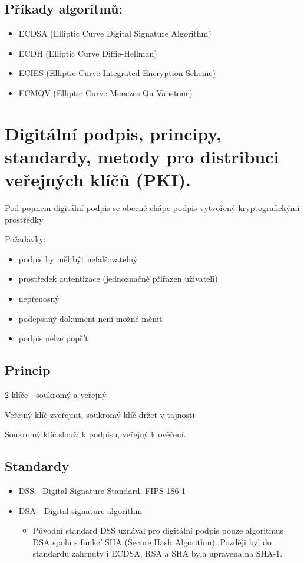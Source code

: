 \subsection{Příkady algoritmů:}
\begin{itemize}
    \item ECDSA (Elliptic Curve Digital Signature Algorithm)
    \item ECDH (Elliptic Curve Diffie-Hellman)
    \item ECIES (Elliptic Curve Integrated Encryption Scheme)
    \item ECMQV (Elliptic Curve Menezes-Qu-Vanstone)
\end{itemize}

\clearpage
\section{Digitální podpis, principy, standardy, metody pro distribuci veřejných klíčů (PKI).}
 
Pod pojmem digitální podpis se obecně chápe podpis vytvořený kryptografickými prostředky

Požadavky:
\begin{itemize}
    \item podpis by měl být nefalšovatelný
    \item prostředek autentizace (jednoznačně přiřazen uživateli)
    \item nepřenosný
    \item podepsaný dokument není možné měnit
    \item podpis nelze popřít
\end{itemize}

\subsection{Princip}
2 klíče - soukromý a veřejný

Veřejný klíč zveřejnit, soukromý klíč držet v tajnosti

Soukromý klíč slouží k podpisu, veřejný k ověření.

\subsection{Standardy}
\begin{itemize}
    \item DSS - Digital Signature Standard. FIPS 186-1 
    \item DSA - Digital signature algorithm
    \begin{itemize}
        \item Původní standard DSS uznával pro digitální podpis pouze algoritmus DSA spolu s funkcí SHA (Secure Hash Algorithm). Později byl do standardu zahrnuty i ECDSA, RSA a SHA byla upravena na SHA-1.
    \end{itemize}
\end{itemize}

